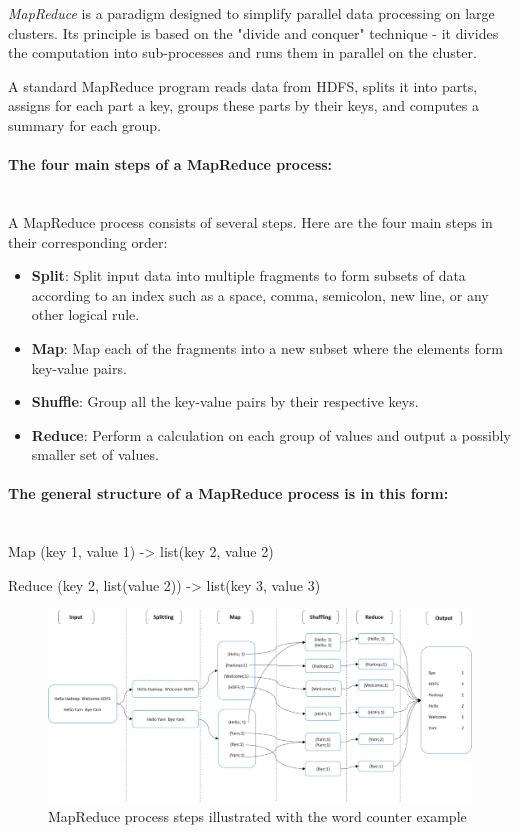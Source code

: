 \documentclass[12pt,english]{book}
\begin{document}
\emph{MapReduce} is a paradigm designed to simplify parallel data processing on large clusters.
Its principle is based on the "divide and conquer" technique - it divides the computation into sub-processes and runs them in parallel on the cluster.

A standard MapReduce program reads data from HDFS, splits it into parts, assigns for each part a key, groups these parts by their keys, and computes a summary for each group.


\paragraph{The four main steps of a MapReduce process:}\mbox{}\\


A MapReduce process consists of several steps. Here are the four main steps in their corresponding order:
 
\begin{itemize}
\item
\textbf{Split}: Split input data into multiple fragments to form subsets of data according to an index such as a space, comma, semicolon, new line, or any other logical rule.
\item
\textbf{Map}: Map each of the fragments into a new subset where the elements form key-value pairs.
\item
\textbf{Shuffle}: Group all the key-value pairs by their respective keys.
\item
\textbf{Reduce}: Perform a calculation on each group of values and output a possibly smaller set of values.
\end{itemize}


\paragraph{The general structure of a MapReduce process is in this form:}\mbox{}\\


Map		(key 1, value 1)		->		list(key 2, value 2)

Reduce	(key 2, list(value 2))	->		list(key 3, value 3)

\begin{figure}[ht]
	\centering
	\includegraphics[width=\linewidth]{mapReduceSchema.png}
	\caption{MapReduce process steps illustrated with the word counter example}
\label{fig:wordCountExample}
\end{figure}
\end{document}
